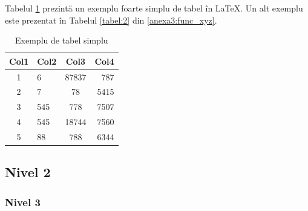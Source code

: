 Tabelul \ref{tabel:tab_simplu} prezintă un exemplu foarte simplu de tabel în \LaTeX. Un alt exemplu este prezentat în Tabelul \ref{tabel:2} din \ref{anexa3:func_xyz}.

\begin{table}[ht]
    \centering
    \caption{Exemplu de tabel simplu}
    \label{tabel:tab_simplu}
    \begin{tabular}{||c l c r||} 
        \hline
        \textbf{Col1} & \textbf{Col2} & \textbf{Col3} & \textbf{Col4} \\
        \hline\hline
        1 & 6 & 87837 & 787 \\ 
        2 & 7 & 78 & 5415 \\
        3 & 545 & 778 & 7507 \\
        4 & 545 & 18744 & 7560 \\
        5 & 88 & 788 & 6344 \\
        \hline
    \end{tabular}
\end{table}

\subsection{Nivel 2}
\label{cap:cap4:nivel1:nivel2}

\subsubsection{Nivel 3}
\label{cap:cap4:nivel1:nivel2:nivel3}

\textcolor{gray}{\lipsum}

\textcolor{gray}{\lipsum}

\textcolor{gray}{\lipsum}

\fi
